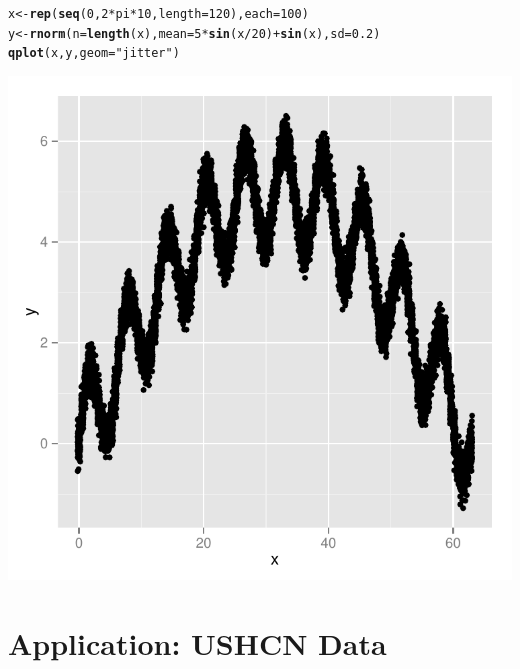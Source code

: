 \documentclass[11pt]{article}\usepackage{graphicx, color}
\makeatletter
\def\maxwidth{ %
  \ifdim\Gin@nat@width>\linewidth
    \linewidth
  \else
    \Gin@nat@width
  \fi
}
\newcommand{\hlfunctioncall}[1]{\textcolor[rgb]{0.501960784313725,0,0.329411764705882}{\textbf{#1}}}%
\newcommand{\hlstring}[1]{\textcolor[rgb]{0.6,0.6,1}{#1}}%
\newenvironment{kframe}{%
 \def\at@end@of@kframe{}%
 \ifinner\ifhmode%
  \def\at@end@of@kframe{\end{minipage}}%
  \begin{minipage}{\columnwidth}%
 \fi\fi%
 \def\FrameCommand##1{\hskip\@totalleftmargin \hskip-\fboxsep
 \colorbox{shadecolor}{##1}\hskip-\fboxsep
     \hskip-\linewidth \hskip-\@totalleftmargin \hskip\columnwidth}%
 \MakeFramed {\advance\hsize-\width
   \@totalleftmargin\z@ \linewidth\hsize
   \@setminipage}}%
 {\par\unskip\endMakeFramed%
 \at@end@of@kframe}
\newenvironment{knitrout}{}{} %
\makeatother
\begin{document}
\begin{knitrout}
\color{fgcolor}\begin{kframe}
\begin{alltt}
x <- \hlfunctioncall{rep}(\hlfunctioncall{seq}(0, 2 * pi * 10, length = 120), each = 100)
y <- \hlfunctioncall{rnorm}(n = \hlfunctioncall{length}(x), mean = 5 * \hlfunctioncall{sin}(x/20) + \hlfunctioncall{sin}(x), sd = 0.2)
\hlfunctioncall{qplot}(x, y, geom = \hlstring{"jitter"})
\end{alltt}
\end{kframe}

{\centering \includegraphics[width=\maxwidth]{figure/fig-sinetrend} 

}



\end{knitrout}


\section{Application: USHCN Data}
\end{document}
